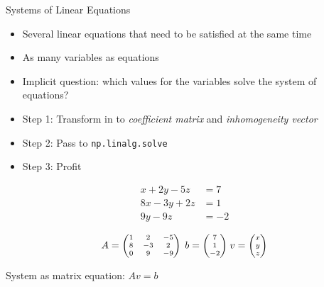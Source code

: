 \begin{frame}[fragile]{Systems of Linear Equations}
%
\begin{itemize}
\item Several linear equations that need to be satisfied at the same time
\item As many variables as equations
\item Implicit question: which values for the variables solve the system of equations?
\item Step 1: Transform in to \emph{coefficient matrix} and \emph{inhomogeneity vector}
\item Step 2: Pass to \texttt{np.linalg.solve}
\item Step 3: Profit
\end{itemize}
%
\begin{tcbraster}[raster columns=2,
                  raster equal height,
                  nobeforeafter,
                  raster column skip=0.2cm]
\begin{tcolorbox}[title=Example]
\begin{align*}
	 x + 2y - 5z &=  7 \\
	8x - 3y + 2z &=  1 \\
	     9y - 9z &= -2
\end{align*}
\end{tcolorbox}
%
\begin{tcolorbox}[title=Coefficient Matrix{,} Inhomogeneity]
\begin{align*}
\scriptsize
A = \begin{pmatrix}
	1 &  2 & -5 \\
	8 & -3 &  2 \\
	0 &  9 & -9
\end{pmatrix}
~
b = \mqty(7 \\ 1 \\ -2)
~
v = \mqty(x \\ y \\ z)
\end{align*}

System as matrix equation: $Av = b$
\end{tcolorbox}
\end{tcbraster}
%
\end{frame}


